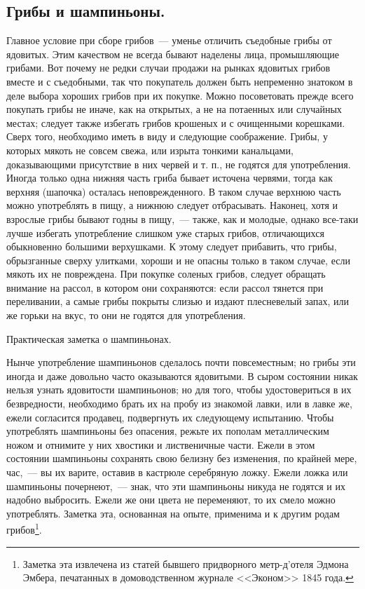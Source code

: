 \subsection{Грибы и шампиньоны.}
Главное условие при сборе грибов~--- уменье отличить съедобные грибы от ядовитых. Этим качеством не всегда бывают наделены лица, промышляющие грибами. Вот почему не редки случаи продажи на рынках ядовитых грибов вместе и с съедобными, так что покупатель должен быть непременно знатоком в деле выбора хороших грибов при их покупке. Можно посоветовать прежде всего покупать грибы не иначе, как на открытых, а не на потаенных или случайных местах; следует также избегать грибов крошеных и с очищенными корешками. Сверх того, необходимо иметь в виду и следующие соображение. Грибы, у которых мякоть не совсем свежа, или изрыта тонкими канальцами, доказывающими присутствие в них червей и т. п., не годятся для употребления. Иногда только одна нижняя часть гриба бывает источена червями, тогда как верхняя (шапочка) осталась неповрежденного. В таком случае верхнюю часть можно употреблять в пищу, а нижнюю следует отбрасывать. Наконец, хотя и взрослые грибы бывают годны в пищу,~--- также, как и молодые, однако все-таки лучше избегать употребление слишком уже старых грибов, отличающихся обыкновенно большими верхушками. К этому следует прибавить, что грибы, обрызганные сверху улитками, хороши и не опасны только в таком случае, если мякоть их не повреждена. При покупке соленых грибов, следует обращать внимание на рассол, в котором они сохраняются: если рассол тянется при переливании, а самые грибы покрыты слизью и издают плесневелый запах, или же горьки на вкус, то они не годятся для употребления.

Практическая заметка о шампиньонах.

Нынче употребление шампиньонов сделалось почти повсеместным; но грибы эти иногда и даже довольно часто оказываются ядовитыми. В сыром состоянии никак нельзя узнать ядовитости шампиньонов; но для того, чтобы удостовериться в их безвредности, необходимо брать их на пробу из знакомой лавки, или в лавке же, ежели согласится продавец, подвергнуть их следующему испытанию. Чтобы употреблять шампиньоны без опасения, режьте их пополам металлическим ножом и отнимите у них хвостики и лиственичные части. Ежели в этом состоянии шампиньоны сохранять свою белизну без изменения, по крайней мере, час,~--- вы их варите, оставив в кастрюле серебряную ложку. Ежели ложка или шампиньоны почернеют,~--- знак, что эти шампиньоны никуда не годятся и их надобно выбросить. Ежели же они цвета не переменяют, то их смело можно употреблять. Заметка эта, основанная на опыте, применима и к другим родам грибов\footnote{Заметка эта извлечена из статей бывшего придворного метр-д'отеля Эдмона Эмбера, печатанных в домоводственном журнале <<Эконом>> 1845 года.}.

